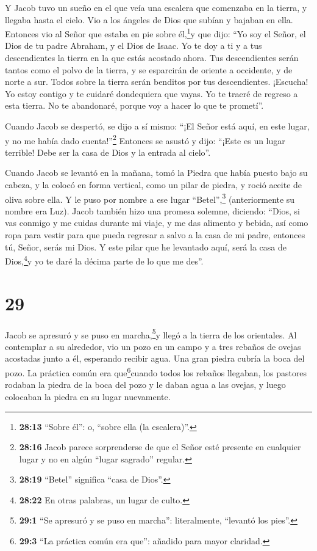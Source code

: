  Y Jacob tuvo un sueño en el que veía una escalera que
comenzaba en la tierra, y llegaba hasta el cielo. Vio a los ángeles de
Dios que subían y bajaban en ella.  Entonces vio al Señor
que estaba en pie sobre él,\footnote{\textbf{28:13} ``Sobre él'': o,
  ``sobre ella (la escalera)''.}y que dijo: ``Yo soy el Señor, el Dios
de tu padre Abraham, y el Dios de Isaac. Yo te doy a ti y a tus
descendientes la tierra en la que estás acostado ahora. 
Tus descendientes serán tantos como el polvo de la tierra, y se
esparcirán de oriente a occidente, y de norte a sur. Todos sobre la
tierra serán benditos por tus descendientes.  ¡Escucha! Yo
estoy contigo y te cuidaré dondequiera que vayas. Yo te traeré de
regreso a esta tierra. No te abandonaré, porque voy a hacer lo que te
prometí''.

 Cuando Jacob se despertó, se dijo a sí mismo: ``¡El Señor
está aquí, en este lugar, y no me había dado cuenta!''\footnote{\textbf{28:16}
  Jacob parece sorprenderse de que el Señor esté presente en cualquier
  lugar y no en algún ``lugar sagrado'' regular.}  Entonces
se asustó y dijo: ``¡Este es un lugar terrible! Debe ser la casa de Dios
y la entrada al cielo''.

 Cuando Jacob se levantó en la mañana, tomó la Piedra que
había puesto bajo su cabeza, y la colocó en forma vertical, como un
pilar de piedra, y roció aceite de oliva sobre ella.  Y le
puso por nombre a ese lugar ``Betel'',\footnote{\textbf{28:19} ``Betel''
  significa ``casa de Dios''.} (anteriormente su nombre era Luz).
 Jacob también hizo una promesa solemne, diciendo: ``Dios,
si vas conmigo y me cuidas durante mi viaje, y me das alimento y bebida,
así como ropa para vestir  para que pueda regresar a salvo
a la casa de mi padre, entonces tú, Señor, serás mi Dios. 
Y este pilar que he levantado aquí, será la casa de Dios,\footnote{\textbf{28:22}
  En otras palabras, un lugar de culto.}y yo te daré la décima parte de
lo que me des''.

\hypertarget{section-28}{%
\section{29}\label{section-28}}

 Jacob se apresuró y se puso en marcha,\footnote{\textbf{29:1}
  ``Se apresuró y se puso en marcha'': literalmente, ``levantó los
  pies''.}y llegó a la tierra de los orientales.  Al
contemplar a su alrededor, vio un pozo en un campo y a tres rebaños de
ovejas acostadas junto a él, esperando recibir agua. Una gran piedra
cubría la boca del pozo.  La práctica común era
que\footnote{\textbf{29:3} ``La práctica común era que'': añadido para
  mayor claridad.}cuando todos los rebaños llegaban, los pastores
rodaban la piedra de la boca del pozo y le daban agua a las ovejas, y
luego colocaban la piedra en su lugar nuevamente.

